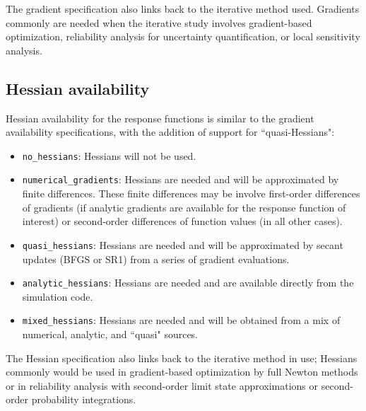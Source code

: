 The gradient specification also links back to the iterative method
used. Gradients commonly are needed when the iterative
study involves gradient-based optimization, reliability analysis for
uncertainty quantification, or local sensitivity analysis.

\subsection{Hessian availability}\label{responses:overview:hessian}

Hessian availability for the response functions is similar to the
gradient availability specifications, with the addition of support
for ``quasi-Hessians":

\begin{itemize}

\item \texttt{no\_hessians}: Hessians will not be used.

\item \texttt{numerical\_gradients}: Hessians are needed and will be
  approximated by finite differences.  These finite differences may be
  involve first-order differences of gradients (if analytic gradients
  are available for the response function of interest) or second-order 
  differences of function values (in all other cases).

\item \texttt{quasi\_hessians}: Hessians are needed and will be 
  approximated by secant updates (BFGS or SR1) from a series of 
  gradient evaluations.

\item \texttt{analytic\_hessians}: Hessians are needed and are
  available directly from the simulation code.

\item \texttt{mixed\_hessians}: Hessians are needed and will be 
  obtained from a mix of numerical, analytic, and ``quasi" sources.

\end{itemize}

The Hessian specification also links back to the iterative method in
use; Hessians commonly would be used in gradient-based
optimization by full Newton methods or in reliability analysis
with second-order limit state approximations or second-order
probability integrations.

